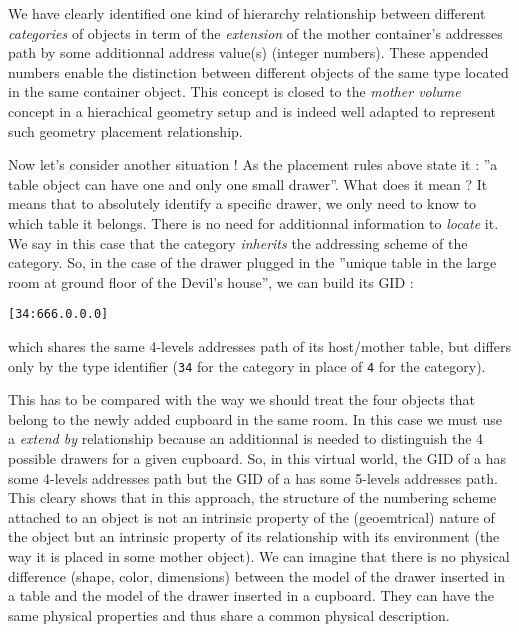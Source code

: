 \pn  We have  clearly identified  one kind  of  hierarchy relationship
between  different  \emph{categories}  of   objects  in  term  of  the
\emph{extension}  of the mother container's 
 addresses path  by some  additionnal address
value(s)  (integer   numbers).  These  appended   numbers  enable  the
distinction between different objects of  the same type located in the
same  container object.  This concept  is closed  to  the \emph{mother
  volume} concept in  a hierachical geometry setup and  is indeed well
adapted to represent such geometry placement relationship.

\pn  Now let's  consider another  situation !  As the  placement rules
above  state it  : ''a  table object  can have  one and  only  one small
drawer''. What  does it mean  ? It means  that to absolutely  identify a
specific  drawer, we  only need  to know  to which  table  it belongs.
There is no need for  additionnal information to \emph{locate} it.  We
say in this case  that the  category \emph{inherits}
the addressing scheme of the   category.  So, in the case of
the drawer plugged  in the ''unique table in the  large room at ground
floor of the Devil's house'', we can build its GID :
\begin{center}
\verb+[34:666.0.0.0]+ 
\end{center}
\pn which shares  the same 4-levels addresses path  of its host/mother
table,  but  differs only  by  the  type  identifier (\texttt{34}  for
the   category in place of \texttt{4} for the
 category).

\pn This  has to  be compared with  the way  we should treat  the four
 objects that belong  to the newly added cupboard in
the  same  room.  In  this   case  we  must  use  a  \emph{extend  by}
relationship because  an additionnal   is needed to
distinguish the 4 possible drawers for a given cupboard. So, in this virtual
world,  the GID of  a   has some  4-levels addresses
path but the  GID of a  has  some 5-levels addresses
path. This  cleary shows that in  this approach, the  structure of the
numbering scheme attached to an object is not an intrinsic property of
the (geoemtrical)  nature of the  object but an intrinsic  property of
its relationship  with its environment (the  way it is  placed in some
mother object).  We can imagine  that there is no  physical difference
(shape, color, dimensions) between the model of the drawer inserted in
a table and  the model of the drawer inserted in  a cupboard. They can
have the  same physical  properties and thus  share a  common physical
description. 

